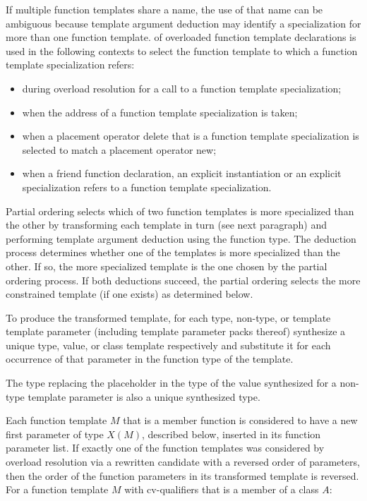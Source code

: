 \pnum
{}%
%
If multiple function templates share a name,
the use of that name can be ambiguous because
template argument deduction may identify
a specialization for more than one function template.
of overloaded function template declarations is used in the following contexts
to select the function template to which a function template specialization
refers:
\begin{itemize}
\item
during overload resolution for a call to a function template specialization;
\item
when the address of a function template specialization is taken;
\item
when a placement operator delete that is a
function template
specialization
is selected to match a placement operator new;
\item
when a friend function declaration, an
explicit instantiation or an explicit specialization refers to
a function template specialization.
\end{itemize}

\pnum
Partial ordering selects which of two function templates is more
specialized than the other by transforming each template in turn
(see next paragraph) and performing template argument deduction
using the function type.
The deduction process determines whether
one of the templates is more specialized than the other. If so, the
more specialized template is the one chosen by the partial ordering
process.
If both deductions succeed, the partial ordering selects
the more constrained template (if one exists) as determined below.

\pnum
To produce the transformed template, for each type, non-type, or template
template parameter (including template parameter packs
thereof) synthesize a unique type, value, or class template
respectively and substitute it for each occurrence of that parameter
in the function type of the template.
\begin{note}
The type replacing the placeholder
in the type of the value synthesized for a non-type template parameter
is also a unique synthesized type.
\end{note}
Each function template $M$ that is a member function
is considered to have
a new first parameter of type $X(M)$, described below,
inserted in its function parameter list.
If exactly one of the function templates was considered by overload resolution
via a rewritten candidate
with a reversed order of parameters,
then the order of the function parameters in its transformed template
is reversed.
For a function template $M$ with cv-qualifiers \cv{}
that is a member of a class $A$:

